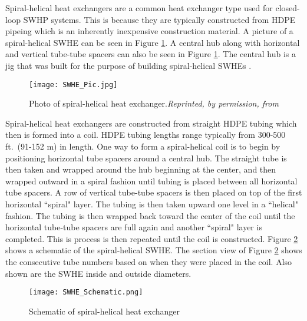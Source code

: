 Spiral-helical heat exchangers are a common heat exchanger type used for closed-loop SWHP systems. This is because they are typically constructed from HDPE pipeing which is an inherently inexpensive construction material. A picture of a spiral-helical SWHE can be seen in Figure \ref{fig:Intro:HXOverview:SpHelHX:SWHEPic}. A central hub along with horizontal and vertical tube-tube spacers can also be seen in Figure \ref{fig:Intro:HXOverview:SpHelHX:SWHEPic}. The central hub is a jig that was built for the purpose of building spiral-helical SWHEs \citep{Hansen2011}.

	\begin{figure}
		\centering
		\texttt{[image: SWHE\_Pic.jpg]}
		\caption[Spiral-helical heat exchanger]{Photo of spiral-helical heat exchanger.\textit{Reprinted, by permission, from \cite{Hansen2011}}}
		\label{fig:Intro:HXOverview:SpHelHX:SWHEPic}
	\end{figure}	
	

Spiral-helical heat exchangers are constructed from straight HDPE tubing which then is formed into a coil. HDPE tubing lengths range typically from 300-500 ft.\ (91-152 m) in length. One way to form a spiral-helical coil is to begin by positioning horizontal tube spacers around a central hub. The straight tube is then taken and wrapped around the hub beginning at the center, and then wrapped outward in a spiral fashion until tubing is placed between all horizontal tube spacers. A row of vertical tube-tube spacers is then placed on top of the first horizontal ``spiral" layer. The tubing is then taken upward one level in a ``helical" fashion. The tubing is then wrapped back toward the center of the coil until the horizontal tube-tube spacers are full again and another ``spiral" layer is completed. This is process is then repeated until the coil is constructed. Figure \ref{fig:Intro:HXOverview:SpHelHX:SWHESchematic} shows a schematic of the spiral-helical SWHE. The section view of Figure \ref{fig:Intro:HXOverview:SpHelHX:SWHESchematic} shows the consecutive tube numbers based on when they were placed in the coil. Also shown are the SWHE inside and outside diameters.
	
	\begin{figure}
		\centering		
		\texttt{[image: SWHE\_Schematic.png]}
		\caption[Schematic of spiral-helical heat exchanger]{Schematic of spiral-helical heat exchanger}			
		\label{fig:Intro:HXOverview:SpHelHX:SWHESchematic}
	\end{figure}
	
